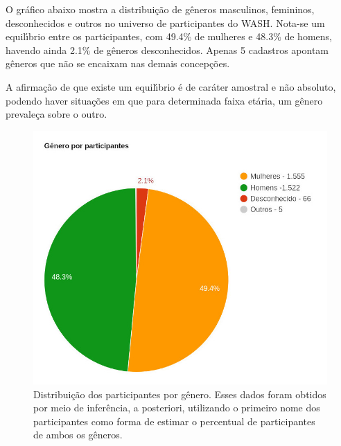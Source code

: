 \documentclass[
12pt,		%
openright,	%
twoside,  %
a4paper,			%
chapter=TITLE,		%
english,			%
french,				%
spanish,			%
brazil				%
]{USPSC-classe/USPSC}
\begin{document}
O gr\'afico abaixo mostra a distribui\c{c}\~ao de g\^eneros masculinos, femininos, desconhecidos e outros no universo de participantes do WASH. Nota-se um equil\'{\i}brio entre os participantes, com 49.4\% de mulheres e 48.3\% de homens, havendo ainda 2.1\% de g\^eneros desconhecidos. Apenas 5 cadastros apontam g\^eneros que n\~ao se encaixam nas demais concep\c{c}\~oes.










A afirma\c{c}\~ao de que existe um equil\'{\i}brio \'e de car\'ater amostral e n\~ao absoluto, podendo haver situa\c{c}\~oes em que para determinada faixa et\'aria, um g\^enero prevale\c{c}a sobre o outro.












\captionsetup{format=plain}
\begin{figure}[max size={\textwidth}{\textheight}]

\centering


\begin{minipage}[b]{0.4\linewidth}
        \centering
                \includegraphics[width=1.0\linewidth]{../../imagens/genero-todos-crop.jpeg}
                \caption{Distribui\c{c}\~ao dos participantes por g\^enero. Esses dados foram obtidos por meio de infer\^encia, a posteriori, utilizando o primeiro nome dos participantes como forma de estimar o percentual de participantes de ambos os g\^eneros.}
                \label{ef11d820efb73d78fb64eb6bdd03853471a8e89f}
\end{minipage}%
\hspace{0.5cm}
\end{figure}
\end{document}
